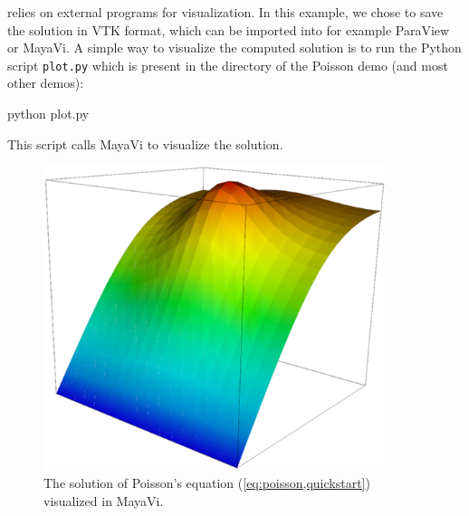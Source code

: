 \dolfin{} relies on external programs for visualization. In this
example, we chose to save the solution in VTK format, which can be
imported into for example ParaView or MayaVi. A simple way to
visualize the computed solution is to run the Python script
\texttt{plot.py} which is present in the directory of the Poisson demo
(and most other demos):
\begin{code}
  python plot.py
\end{code}
This script calls MayaVi to visualize the solution.

\begin{figure}[htbp]
  \begin{center}
    \includegraphics[width=10cm]{eps/poisson.eps}
    \caption{The solution of Poisson's equation (\ref{eq:poisson,quickstart})
      visualized in MayaVi.}
  \end{center}
\end{figure}
